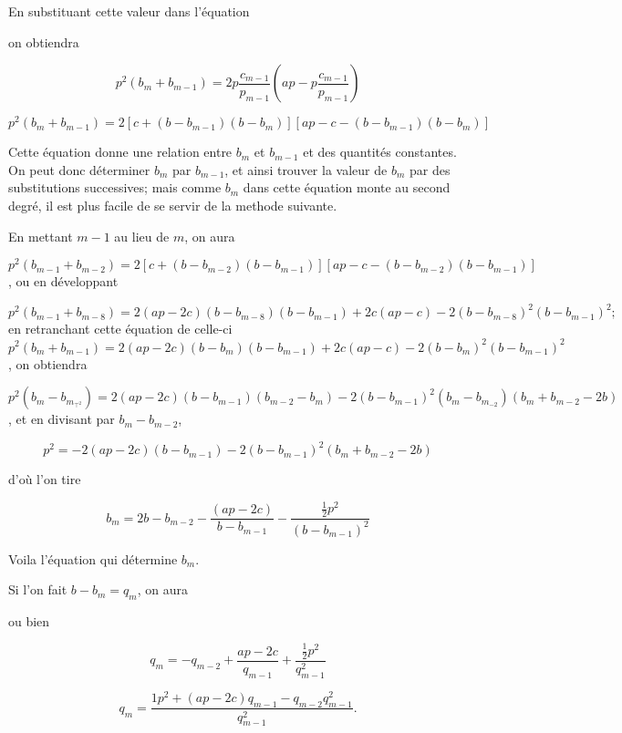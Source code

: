 \documentclass{article}
\begin{document}
En substituant cette valeur dans l'équation

on obtiendra

\[
p^{2}\left(b_{m}+b_{m-1}\right)=2 p \frac{c_{m-1}}{p_{m-1}}\left(a p-p \frac{c_{m-1}}{p_{m-1}}\right)
\]

\[
p^{2}\left(b_{m}+b_{m-1}\right)=2\left[c+\left(b-b_{m-1}\right)\left(b-b_{m}\right)\right]\left[a p-c-\left(b-b_{m-1}\right)\left(b-b_{m}\right)\right]
\]

Cette équation donne une relation entre \(b_{m}\) et \(b_{m-1}\) et des quantités constantes. On peut donc déterminer \(b_{m}\) par \(b_{m-1}\), et ainsi trouver la valeur de \(b_{m}\) par des substitutions successives; mais comme \(b_{m}\) dans cette équation monte au second degré, il est plus facile de se servir de la methode suivante.

En mettant \(m-1\) au lieu de \(m\), on aura

\(p^{2}\left(b_{m-1}+b_{m-2}\right)=2\left[c+\left(b-b_{m-2}\right)\left(b-b_{m-1}\right)\right]\left[a p-c-\left(b-b_{m-2}\right)\left(b-b_{m-1}\right)\right]\), ou en développant

\(p^{2}\left(b_{m-1}+b_{m-8}\right)=2(a p-2 c)\left(b-b_{m-8}\right)\left(b-b_{m-1}\right)+2 c(a p-c)-2\left(b-b_{m-8}\right)^{2}\left(b-b_{m-1}\right)^{2} ;\) en retranchant cette équation de celle-ci
\(p^{2}\left(b_{m}+b_{m-1}\right)=2(a p-2 c)\left(b-b_{m}\right)\left(b-b_{m-1}\right)+2 c(a p-c)-2\left(b-b_{m}\right)^{2}\left(b-b_{m-1}\right)^{2}\), on obtiendra

\(p^{2}\left(b_{m}-b_{m_{\top^{2}}}\right)=2(a p-2 c)\left(b-b_{m-1}\right)\left(b_{m-2}-b_{m}\right)-2\left(b-b_{m-1}\right)^{2}\left(b_{m}-b_{m_{-2}}\right)\left(b_{m}+b_{m-2}-2 b\right)\), et en divisant par \(b_{m}-b_{m-2}\),

\[
p^{2}=-2(a p-2 c)\left(b-b_{m-1}\right)-2\left(b-b_{m-1}\right)^{2}\left(b_{m}+b_{m-2}-2 b\right)
\]

d'où l'on tire

\[
b_{m}=2 b-b_{m-2}-\frac{(a p-2 c)}{b-b_{m-1}}-\frac{\frac{1}{2} p^{2}}{\left(b-b_{m-1}\right)^{2}}
\]

Voila l'équation qui détermine \(b_{m}\).

Si l'on fait \(b-b_{m}=q_{m}\), on aura

ou bien

\[
q_{m}=-q_{m-2}+\frac{a p-2 c}{q_{m-1}}+\frac{\frac{1}{2} p^{2}}{q_{m-1}^{2}}
\]

\[
q_{m}=\frac{1 p^{2}+(a p-2 c) q_{m-1}-q_{m-2} q_{m-1}^{2}}{q_{m-1}^{2}} .
\]
\end{document}
